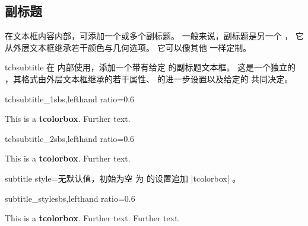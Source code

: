 \clearpage
\subsection{副标题}

在文本框内容内部，可添加一个或多个副标题。
一般来说，副标题是另一个 ，
它从外层文本框继承若干颜色与几何选项。
它可以像其他  一样定制。

\begin{docCommand}[doc new=2014-10-10]{tcbsubtitle}{}
  在  内部使用，添加一个带有给定  的副标题文本框。
  这是一个独立的 ，其格式由外层文本框继承的若干属性、
   的进一步设置以及给定的  共同决定。
\begin{exdispExample*}{tcbsubtitle_1}{sbs,lefthand ratio=0.6}
\begin{tcolorbox}[title=My title,
    colback=red!5!white,
    colframe=red!75!black,
    fonttitle=\bfseries]
  This is a \textbf{tcolorbox}.
  Further text.
\end{tcolorbox}
\end{exdispExample*}
\begin{exdispExample*}{tcbsubtitle_2}{sbs,lefthand ratio=0.6}
\begin{tcolorbox}[title=My title,
    colback=red!5!white,
    colframe=red!75!black,
    colbacktitle=yellow!50!red,
    coltitle=red!25!black,
    fonttitle=\bfseries]
  This is a \textbf{tcolorbox}.
  Further text.
\end{tcolorbox}
\end{exdispExample*}
\end{docCommand}

\begin{docTcbKey}[][doc new=2014-10-10]{subtitle style}{=}{无默认值，初始为空}
  为  的设置追加 |tcolorbox| 。
\begin{exdispExample*}{subtitle_style}{sbs,lefthand ratio=0.6}
\begin{tcolorbox}[title=My title,
  colback=red!5!white,
  colframe=red!75!black,
  colbacktitle=yellow!50!red,
  coltitle=red!25!black,
  fonttitle=\bfseries,
  subtitle style={boxrule=0.4pt,
    colback=yellow!50!red!25!white,
    colupper=red!75!gray} ]
  This is a \textbf{tcolorbox}.
  Further text.
  Further text.
\end{tcolorbox}
\end{exdispExample*}
\end{docTcbKey}

